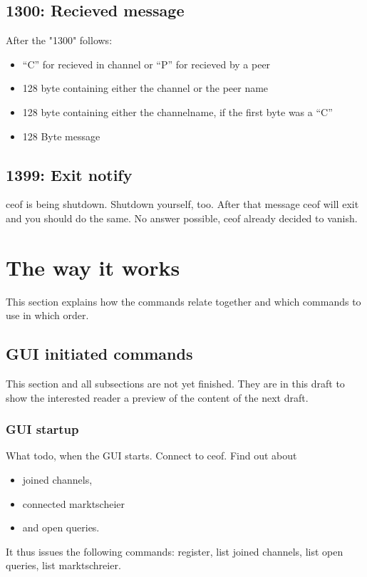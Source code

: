 \documentclass[12pt,a4paper]{book}
\begin{document}
\subsection{1300: Recieved message}
After the "1300" follows:
\begin{itemize}
\item "`C"' for recieved in channel or "`P"' for recieved by a peer
\item 128 byte containing either the channel or the peer name
\item 128 byte containing either the channelname, if the first byte was a "`C"'
\item 128 Byte message
\end{itemize}
\subsection{1399: Exit notify}
ceof is being shutdown.
Shutdown yourself, too.
After that message ceof will exit and you should do the same.
No answer possible, ceof already decided to vanish.
\section{The way it works}
This section explains how the commands relate together and which commands to use
in which order.

\subsection{GUI initiated commands}
This section and all subsections are not yet finished. They
are in this draft to show the interested reader a preview of the
content of the next draft.
\subsubsection{GUI startup}
What todo, when the GUI starts.
Connect to ceof. Find out about
\begin{itemize}
\item joined channels,
\item connected marktscheier
\item and open queries.
\end{itemize}
It thus issues the following commands:
register, list joined channels, list open queries, list marktschreier.
\end{document}
